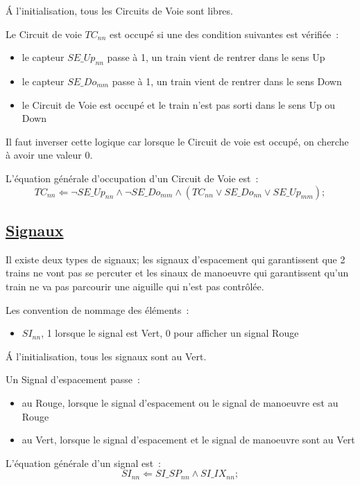 \'A l'initialisation, tous les Circuits de Voie sont libres.

\medskip
Le Circuit de voie $TC_{nn}$ est occupé si une des condition suivantes
est vérifiée~:
\begin{itemize}
\item le capteur $SE\_Up_{nn}$ passe à 1, un train vient de rentrer dans
  le sens Up
\item le capteur $SE\_Do_{mm}$ passe à 1, un train vient de rentrer dans
  le sens Down
\item le Circuit de Voie est occupé et le train n'est pas sorti dans
  le sens Up ou Down
\end{itemize}

Il faut inverser cette logique car lorsque le Circuit de voie est
occupé, on cherche à avoir une valeur 0.

\medskip
L'équation générale d'occupation d'un Circuit de Voie est~:
$$\boxed{
  TC_{nn} \Leftarrow \neg SE\_Up_{nn} \land \neg SE\_Do_{mm} \land
  (TC_{nn} \lor SE\_Do_{nn} \lor SE\_Up_{mm});
}$$


\subsection{\underline{Signaux}}
\label{sec:esp}

Il existe deux types de signaux; les signaux d'espacement qui
garantissent que 2 trains ne vont pas se percuter et les sinaux de
manoeuvre qui garantissent qu'un train ne va pas parcourir une
aiguille qui n'est pas contrôlée.

Les convention de nommage des éléments~:
\begin{itemize}
\item $SI_{nn}$, 1 lorsque le signal est Vert, 0 pour afficher un signal
  Rouge
\end{itemize}

\'A l'initialisation, tous les signaux sont au Vert.

Un Signal d'espacement passe~:
\begin{itemize}
\item au Rouge, lorsque le signal d'espacement ou le signal de
  manoeuvre est au Rouge
\item au Vert, lorsque le signal d'espacement et le signal de
  manoeuvre sont au Vert
\end{itemize}


\medskip
L'équation générale d'un signal est~:
$$\boxed{
  SI_{nn} \Leftarrow SI\_SP_{nn} \land SI\_IX_{nn};
}$$


